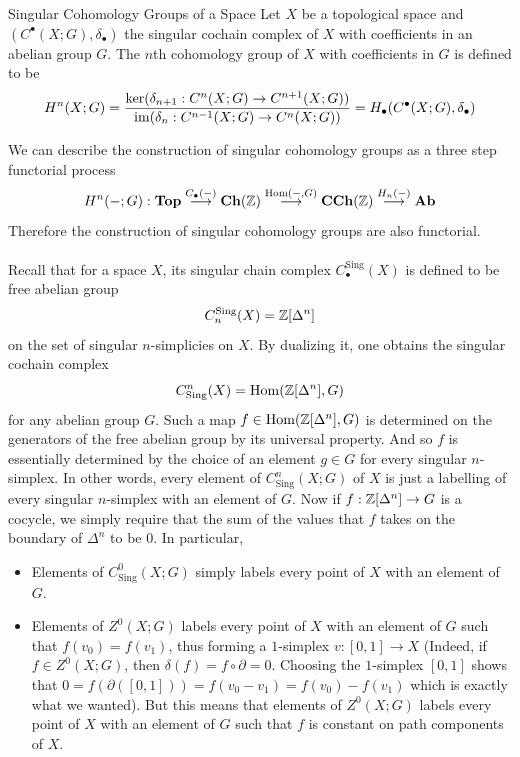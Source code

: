 \documentclass[a4paper]{article}
\begin{document}
\begin{defn}{Singular Cohomology Groups of a Space}{} Let $X$ be a topological space and $(C^\bullet(X;G),\delta_\bullet)$ the singular cochain complex of $X$ with coefficients in an abelian group $G$. The $n$th cohomology group of $X$ with coefficients in $G$ is defined to be $$H^n(X;G)=\frac{\ker(\delta_{n+1}:C^n(X;G)\to C^{n+1}(X;G))}{\operatorname{im}(\delta_n:C^{n-1}(X;G)\to C^n(X;G))}=H_\bullet(C^\bullet(X;G),\delta_\bullet)$$
\end{defn}

We can describe the construction of singular cohomology groups as a three step functorial process $$H^n(-;G):\bold{Top}\overset{C_\bullet(-)}{\longrightarrow}\bold{Ch}(\mathbb{Z})\overset{\operatorname{Hom}(-,G)}{\longrightarrow}\bold{CCh}(\mathbb{Z})\overset{H_n(-)}{\longrightarrow}\bold{Ab}$$ Therefore the construction of singular cohomology groups are also functorial. \\~\\

Recall that for a space $X$, its singular chain complex $C_\bullet^\text{Sing}(X)$ is defined to be free abelian group $$C_n^\text{Sing}(X)=\mathbb{Z}[\Delta^n]$$ on the set of singular $n$-simplicies on $X$. By dualizing it, one obtains the singular cochain complex $$C_\text{Sing}^n(X)=\operatorname{Hom}(\mathbb{Z}[\Delta^n],G)$$ for any abelian group $G$. Such a map $f\in\operatorname{Hom}(\mathbb{Z}[\Delta^n],G)$ is determined on the generators of the free abelian group by its universal property. And so $f$ is essentially determined by the choice of an element $g\in G$ for every singular $n$-simplex. In other words, every element of $C_\text{Sing}^n(X;G)$ of $X$ is just a labelling of every singular $n$-simplex with an element of $G$. Now if $f:\mathbb{Z}[\Delta^n]\to G$ is a cocycle, we simply require that the sum of the values that $f$ takes on the boundary of $\Delta^n$ to be $0$. In particular, 
\begin{itemize}
\item Elements of $C_\text{Sing}^0(X;G)$ simply labels every point of $X$ with an element of $G$. 
\item Elements of $Z^0(X;G)$ labels every point of $X$ with an element of $G$ such that $f(v_0)=f(v_1)$, thus forming a $1$-simplex $v:[0,1]\to X$ (Indeed, if $f\in Z^0(X;G)$, then $\delta(f)=f\circ\partial=0$. Choosing the $1$-simplex $[0,1]$ shows that $0=f(\partial([0,1]))=f(v_0-v_1)=f(v_0)-f(v_1)$ which is exactly what we wanted). But this means that elements of $Z^0(X;G)$ labels every point of $X$ with an element of $G$ such that $f$ is constant on path components of $X$. 
\end{itemize}
\end{document}
